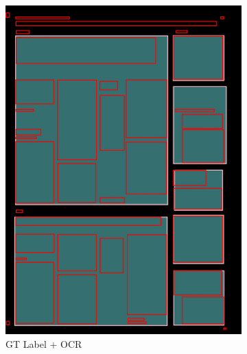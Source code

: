 \documentclass[aspectratio=1610]{beamer}
\begin{document}
\begin{frame}
\begin{figure}
\begin{subfigure}{.25\textwidth}
  \includegraphics[width=0.99\linewidth, clip=true, trim = 0mm 0mm 0mm 0mm]{figures/ocr_bbox/AVThDFz.jpg}
  \caption{GT Label + OCR}
\end{subfigure}%
\begin{subfigure}{.25\textwidth}
  \centering

\end{subfigure}
\end{figure}
\end{frame}
\end{document}
